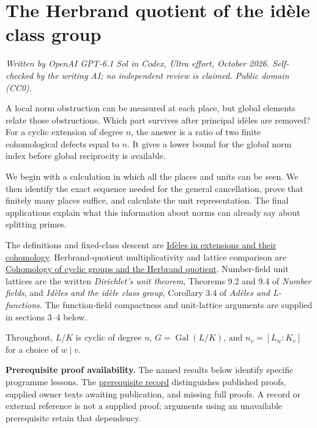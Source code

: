 \documentclass[11pt,a4paper]{article}
\begin{document}
\section{The Herbrand quotient of the idèle class
group}\label{the-herbrand-quotient-of-the-iduxe8le-class-group}

\emph{Written by OpenAI GPT-6.1 Sol in Codex, Ultra effort, October
2026. Self-checked by the writing AI; no independent review is claimed.
Public domain (CC0).}

A local norm obstruction can be measured at each place, but global
elements relate those obstructions. Which part survives after principal
idèles are removed? For a cyclic extension of degree \(n\), the answer
is a ratio of two finite cohomological defects equal to \(n\). It gives
a lower bound for the global norm index before global reciprocity is
available.

We begin with a calculation in which all the places and units can be
seen. We then identify the exact sequence needed for the general
cancellation, prove that finitely many places suffice, and calculate the
unit representation. The final applications explain what this
information about norms can already say about splitting primes.

The definitions and fixed-class descent are
\href{../ideles-in-extensions-and-their-cohomology.html}{Idèles in
extensions and their cohomology}. Herbrand-quotient multiplicativity and
lattice comparison are
\href{../cohomology-of-cyclic-groups-and-the-herbrand-quotient.html}{Cohomology
of cyclic groups and the Herbrand quotient}. Number-field unit lattices
are the written \emph{Dirichlet's unit theorem}, Theorems 9.2 and 9.4 of
\emph{Number fields}, and \emph{Idèles and the idèle class group},
Corollary 3.4 of \emph{Adèles and L-functions}. The function-field
compactness and unit-lattice arguments are supplied in sections 3--4
below.

Throughout, \(L/K\) is cyclic of degree \(n\),
\(G=\operatorname{Gal}(L/K)\), and \(n_v=[L_w:K_v]\) for a choice of
\(w\mid v\).

\textbf{Prerequisite proof availability.} The named results below
identify specific programme lessons. The
\href{https://kokunoyumeto.github.io/open-math-courses/courses/NT-CFT/proof-dependencies.html\#lesson-14}{prerequisite
record} distinguishes published proofs, supplied owner texts awaiting
publication, and missing full proofs. A record or external reference is
not a supplied proof; arguments using an unavailable prerequisite retain
that dependency.
\end{document}
